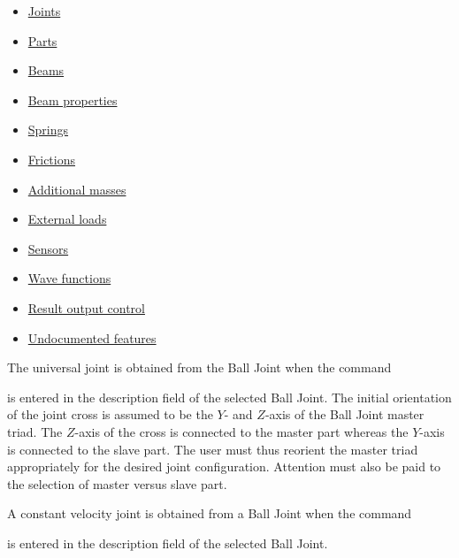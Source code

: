 \begin{itemize}
\item\protect\hyperlink{joints-1}{Joints}
\item\protect\hyperlink{parts-1}{Parts}
\item\protect\hyperlink{beams-1}{Beams}
\item\protect\hyperlink{beam-properties-1}{Beam properties}
\item\protect\hyperlink{springs}{Springs}
\item\protect\hyperlink{frictions-1}{Frictions}
\item\protect\hyperlink{additional-masses}{Additional masses}
\item\protect\hyperlink{external-loads}{External loads}
\item\protect\hyperlink{sensors-1}{Sensors}
\item\protect\hyperlink{wave-functions}{Wave functions}
\item\protect\hyperlink{result-output-control-2}{Result output control}
\item\protect\hyperlink{undocumented-features}{Undocumented features}
\end{itemize}




The universal joint is obtained from the Ball Joint when the command


\noindent
is entered in the description field of the selected Ball Joint.
The initial orientation of the joint cross is assumed to be the $Y$- and
$Z$-axis of the Ball Joint master triad. The $Z$-axis of the cross is connected
to the master part whereas the $Y$-axis is connected to the slave part.
The user must thus reorient the master triad appropriately for the desired joint
configuration.
Attention must also be paid to the selection of master versus slave part.



A constant velocity joint is obtained from a Ball Joint when the command


\noindent
is entered in the description field of the selected Ball Joint.

